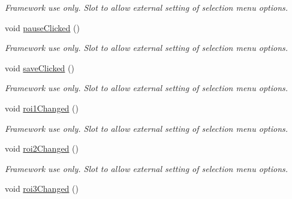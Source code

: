 \begin{DoxyCompactItemize}
\begin{DoxyCompactList}\small\item\em Framework use only. Slot to allow external setting of selection menu options. \end{DoxyCompactList}\item 
\hypertarget{classQEImage_ad9d9fae6343a22eaf75870d889cc8c28}{
void \hyperlink{classQEImage_ad9d9fae6343a22eaf75870d889cc8c28}{pauseClicked} ()}
\label{classQEImage_ad9d9fae6343a22eaf75870d889cc8c28}

\begin{DoxyCompactList}\small\item\em Framework use only. Slot to allow external setting of selection menu options. \end{DoxyCompactList}\item 
\hypertarget{classQEImage_a09fd6c6db9d97274da1636f17b3dca46}{
void \hyperlink{classQEImage_a09fd6c6db9d97274da1636f17b3dca46}{saveClicked} ()}
\label{classQEImage_a09fd6c6db9d97274da1636f17b3dca46}

\begin{DoxyCompactList}\small\item\em Framework use only. Slot to allow external setting of selection menu options. \end{DoxyCompactList}\item 
\hypertarget{classQEImage_a08f0dbc6afa7f7c766f64442ad031324}{
void \hyperlink{classQEImage_a08f0dbc6afa7f7c766f64442ad031324}{roi1Changed} ()}
\label{classQEImage_a08f0dbc6afa7f7c766f64442ad031324}

\begin{DoxyCompactList}\small\item\em Framework use only. Slot to allow external setting of selection menu options. \end{DoxyCompactList}\item 
\hypertarget{classQEImage_a0547d4be9aa3678a6a02afe738d679df}{
void \hyperlink{classQEImage_a0547d4be9aa3678a6a02afe738d679df}{roi2Changed} ()}
\label{classQEImage_a0547d4be9aa3678a6a02afe738d679df}

\begin{DoxyCompactList}\small\item\em Framework use only. Slot to allow external setting of selection menu options. \end{DoxyCompactList}\item 
\hypertarget{classQEImage_a721cebe4d2faae188667bf38e294d0c6}{
void \hyperlink{classQEImage_a721cebe4d2faae188667bf38e294d0c6}{roi3Changed} ()}
\label{classQEImage_a721cebe4d2faae188667bf38e294d0c6}


\end{DoxyCompactItemize}
